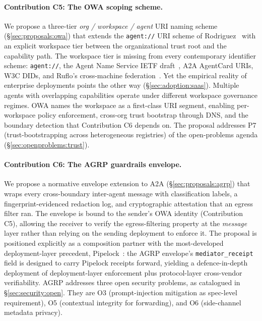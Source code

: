 \paragraph{Contribution C5: The OWA scoping scheme.}
We propose a three-tier \emph{org / workspace / agent} URI naming
scheme (\S\ref{sec:proposals:owa}) that extends the
\texttt{agent://} URI scheme of Rodriguez~\cite{agent_uri_scheme}
with an explicit workspace tier between the organizational trust
root and the capability path. The workspace tier is missing from
every contemporary identifier scheme: \texttt{agent://}, the
Agent Name Service IETF draft~\cite{ans_ietf}, A2A AgentCard URIs,
W3C DIDs, and Ruflo's cross-machine federation~\cite{ruflo}.
Yet the empirical reality of enterprise deployments points the
other way (\S\ref{sec:adoption:saas}). Multiple agents with
overlapping capabilities operate under different workspace
governance regimes. OWA names the workspace as a first-class
URI segment, enabling per-workspace policy enforcement, cross-org
trust bootstrap through DNS, and the boundary detection that
Contribution C6 depends on. The proposal addresses P7
(trust-bootstrapping across heterogeneous registries) of the
open-problems agenda (\S\ref{sec:openproblems:trust}).

\paragraph{Contribution C6: The AGRP guardrails envelope.}
We propose a normative envelope extension to A2A
(\S\ref{sec:proposals:agrp}) that wraps every cross-boundary
inter-agent message with classification labels, a
fingerprint-evidenced redaction log, and cryptographic
attestation that an egress filter ran. The envelope is bound to
the sender's OWA identity (Contribution C5), allowing the
receiver to verify the egress-filtering property at the
\emph{message} layer rather than relying on the sending
deployment to enforce it. The proposal is positioned explicitly
as a composition partner with the most-developed deployment-layer
precedent, Pipelock~\cite{pipelock}: the AGRP envelope's
\texttt{mediator\_receipt} field is designed to carry Pipelock
receipts forward, yielding a defence-in-depth deployment of
deployment-layer enforcement plus protocol-layer cross-vendor
verifiability. AGRP addresses three open security problems, as
catalogued in \S\ref{sec:security:open}. They are
O3 (prompt-injection mitigation as spec-level requirement),
O5 (contextual integrity for forwarding), and O6 (side-channel
metadata privacy).

